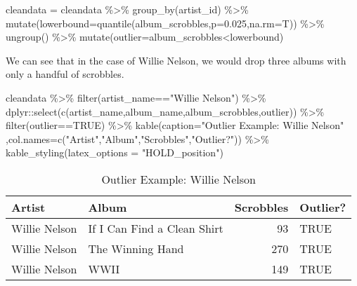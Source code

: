 \documentclass[
  11pt,
]{article}
\newenvironment{Shaded}{\begin{snugshade}}{\end{snugshade}}
\newcommand{\AttributeTok}[1]{\textcolor[rgb]{0.77,0.63,0.00}{#1}}
\newcommand{\ConstantTok}[1]{\textcolor[rgb]{0.00,0.00,0.00}{#1}}
\newcommand{\FloatTok}[1]{\textcolor[rgb]{0.00,0.00,0.81}{#1}}
\newcommand{\FunctionTok}[1]{\textcolor[rgb]{0.00,0.00,0.00}{#1}}
\newcommand{\NormalTok}[1]{#1}
\newcommand{\OtherTok}[1]{\textcolor[rgb]{0.56,0.35,0.01}{#1}}
\newcommand{\SpecialCharTok}[1]{\textcolor[rgb]{0.00,0.00,0.00}{#1}}
\newcommand{\StringTok}[1]{\textcolor[rgb]{0.31,0.60,0.02}{#1}}
\begin{document}
\begin{Shaded}
\begin{Highlighting}[]
\NormalTok{cleandata }\OtherTok{=}\NormalTok{ cleandata }\SpecialCharTok{\%\textgreater{}\%}
  \FunctionTok{group\_by}\NormalTok{(artist\_id) }\SpecialCharTok{\%\textgreater{}\%}
  \FunctionTok{mutate}\NormalTok{(}\AttributeTok{lowerbound=}\FunctionTok{quantile}\NormalTok{(album\_scrobbles,}\AttributeTok{p=}\FloatTok{0.025}\NormalTok{,}\AttributeTok{na.rm=}\NormalTok{T)) }\SpecialCharTok{\%\textgreater{}\%}
  \FunctionTok{ungroup}\NormalTok{() }\SpecialCharTok{\%\textgreater{}\%}
  \FunctionTok{mutate}\NormalTok{(}\AttributeTok{outlier=}\NormalTok{album\_scrobbles}\SpecialCharTok{\textless{}}\NormalTok{lowerbound) }
\end{Highlighting}
\end{Shaded}

We can see that in the case of Willie Nelson, we would drop three albums
with only a handful of scrobbles.

\begin{Shaded}
\begin{Highlighting}[]
\NormalTok{cleandata }\SpecialCharTok{\%\textgreater{}\%}
  \FunctionTok{filter}\NormalTok{(artist\_name}\SpecialCharTok{==}\StringTok{"Willie Nelson"}\NormalTok{) }\SpecialCharTok{\%\textgreater{}\%}
\NormalTok{  dplyr}\SpecialCharTok{::}\FunctionTok{select}\NormalTok{(}\FunctionTok{c}\NormalTok{(artist\_name,album\_name,album\_scrobbles,outlier)) }\SpecialCharTok{\%\textgreater{}\%}
  \FunctionTok{filter}\NormalTok{(outlier}\SpecialCharTok{==}\ConstantTok{TRUE}\NormalTok{) }\SpecialCharTok{\%\textgreater{}\%}
  \FunctionTok{kable}\NormalTok{(}\AttributeTok{caption=}\StringTok{"Outlier Example: Willie Nelson"}
\NormalTok{        ,}\AttributeTok{col.names=}\FunctionTok{c}\NormalTok{(}\StringTok{"Artist"}\NormalTok{,}\StringTok{"Album"}\NormalTok{,}\StringTok{"Scrobbles"}\NormalTok{,}\StringTok{"Outlier?"}\NormalTok{)) }\SpecialCharTok{\%\textgreater{}\%}
  \FunctionTok{kable\_styling}\NormalTok{(}\AttributeTok{latex\_options =} \StringTok{"HOLD\_position"}\NormalTok{)}
\end{Highlighting}
\end{Shaded}

\begin{table}[H]

\caption{\label{tab:unnamed-chunk-25}Outlier Example: Willie Nelson}
\centering
\begin{tabular}[t]{l|l|r|l}
\hline
Artist & Album & Scrobbles & Outlier?\\
\hline
Willie Nelson & If I Can Find a Clean Shirt & 93 & TRUE\\
\hline
Willie Nelson & The Winning Hand & 270 & TRUE\\
\hline
Willie Nelson & WWII & 149 & TRUE\\
\hline
\end{tabular}
\end{table}
\end{document}
